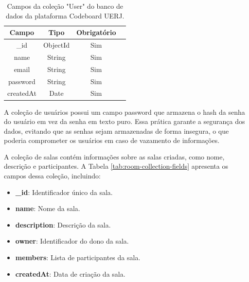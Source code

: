 \begin{table}[H]
    \centering
    \caption{Campos da coleção "User" do banco de dados da plataforma Codeboard UERJ.}
    \label{tab:user-collection-fields}
    \renewcommand{\arraystretch}{1.3} 
    \begin{tabular}{|c|c|c|c|}
        \hline
        \textbf{Campo}   & \textbf{Tipo} & \textbf{Obrigatório} \\
        \hline
        \_id            & ObjectId      & Sim                  \\
        \hline
        name              & String        & Sim                  \\
        \hline
        email              & String        & Sim                  \\
        \hline
        password         & String        & Sim                  \\
        \hline
        createdAt        & Date          & Sim                  \\
        \hline
    \end{tabular}
\end{table}

A coleção de usuários possui um campo password que armazena o hash da senha do usuário em vez da senha em texto puro. Essa prática garante a segurança dos dados, evitando que as senhas sejam armazenadas de forma insegura, o que poderia comprometer os usuários em caso de vazamento de informações.


A coleção de salas contém informações sobre as salas criadas, como nome, descrição e participantes. A Tabela \ref{tab:room-collection-fields} apresenta os campos dessa coleção, incluindo:

\begin{itemize}
    \item \textbf{\_id}: Identificador único da sala.
    \item \textbf{name}: Nome da sala.
    \item \textbf{description}: Descrição da sala.
    \item \textbf{owner}: Identificador do dono da sala.
    \item \textbf{members}: Lista de participantes da sala.
    \item \textbf{createdAt}: Data de criação da sala.
\end{itemize}

